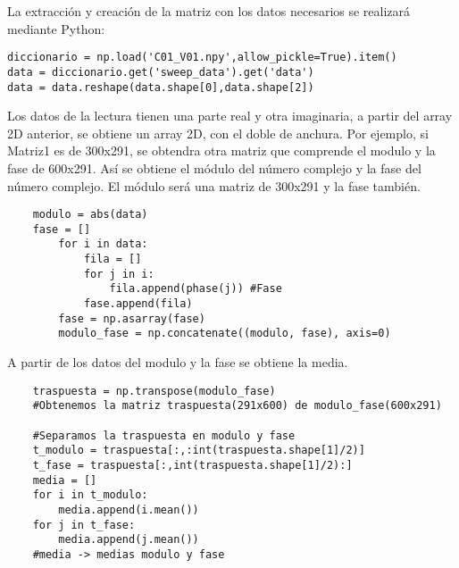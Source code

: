 La extracción y creación de la matriz con los datos necesarios se realizará mediante Python:

\begin{verbatim}
diccionario = np.load('C01_V01.npy',allow_pickle=True).item()
data = diccionario.get('sweep_data').get('data')
data = data.reshape(data.shape[0],data.shape[2])
\end{verbatim}

Los datos de la lectura tienen una parte real y otra imaginaria, a partir del array 2D anterior, se obtiene un array 2D, con el doble de anchura.
Por ejemplo, si Matriz1 es de 300x291, se obtendra otra matriz que comprende el modulo y la fase de 600x291. Así se obtiene el módulo del número complejo y la fase del número complejo.
El módulo será una matriz de 300x291 y la fase también.

\begin{verbatim}
	modulo = abs(data)
	fase = []
		for i in data:
			fila = []
			for j in i:
				fila.append(phase(j)) #Fase
			fase.append(fila)
   	 	fase = np.asarray(fase)
   	 	modulo_fase = np.concatenate((modulo, fase), axis=0)
\end{verbatim}

A partir de los datos del modulo y la fase se obtiene la media.
\begin{verbatim}
	traspuesta = np.transpose(modulo_fase)
	#Obtenemos la matriz traspuesta(291x600) de modulo_fase(600x291)

	#Separamos la traspuesta en modulo y fase
	t_modulo = traspuesta[:,:int(traspuesta.shape[1]/2)]
	t_fase = traspuesta[:,int(traspuesta.shape[1]/2):]
	media = []
	for i in t_modulo:
    	media.append(i.mean())
	for j in t_fase:
    	media.append(j.mean())
	#media -> medias modulo y fase
\end{verbatim}